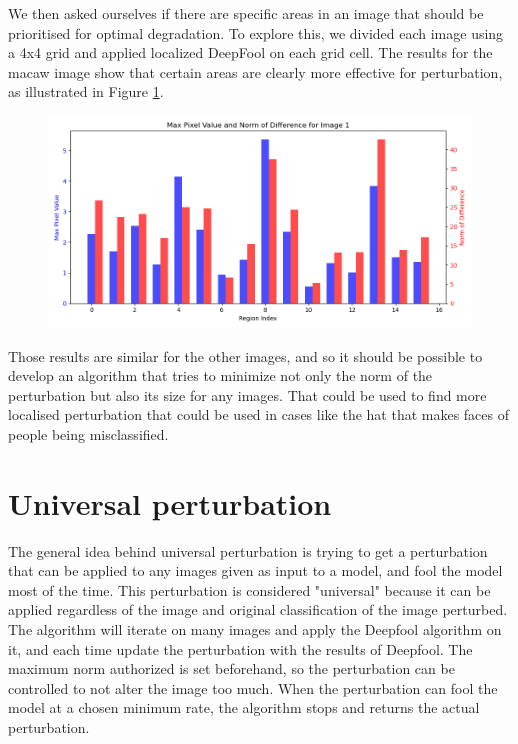 \documentclass{article}
\begin{document}
We then asked ourselves if there are specific areas in an image that should be prioritised for optimal degradation. To explore this, we divided each image using a 4x4 grid and applied localized DeepFool on each grid cell. The results for the macaw image show that certain areas are clearly more effective for perturbation, as illustrated in Figure \ref{fig:max_1}. 

\begin{figure}[H]
    \centering
    \includegraphics[width=1\linewidth]{results/max_value_pixel_norm_diff_1.png}
    \caption{}
    \label{fig:max_1}
\end{figure}

Those results are similar for the other images, and so it should be possible to develop an algorithm that tries to minimize not only the norm of the perturbation but also its size for any images. That could be used to find more localised perturbation that could be used in cases like the hat that makes faces of people being misclassified.

\newpage
\section{Universal perturbation}

The general idea behind universal perturbation is trying to get a perturbation that can be applied to any images given as input to a model, and fool the model most of the time. This perturbation is considered "universal" because it can be applied regardless of the image and original classification of the image perturbed.\\

The algorithm will iterate on many images and apply the Deepfool algorithm on it, and each time update the perturbation with the results of Deepfool. The maximum norm authorized is set beforehand, so the perturbation can be controlled to not alter the image too much. When the perturbation can fool the model at a chosen minimum rate, the algorithm stops and returns the actual perturbation.
\end{document}

